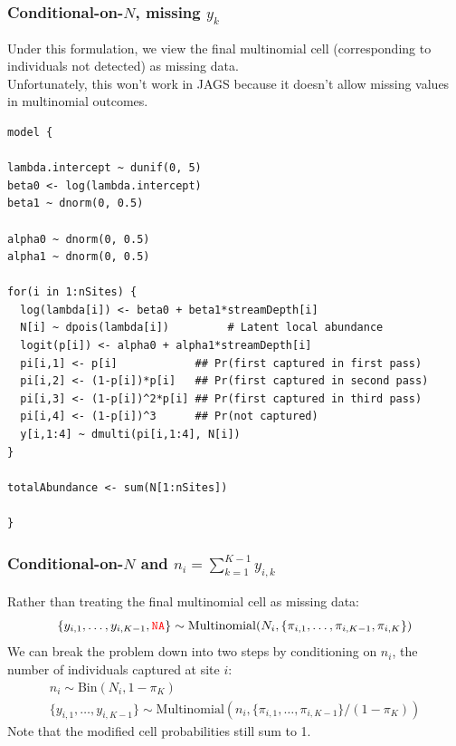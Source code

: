 \documentclass[color=usenames,dvipsnames]{beamer}\usepackage[]{graphicx}\usepackage[]{color}
\makeatletter
\newenvironment{kframe}{%
 \def\at@end@of@kframe{}%
 \ifinner\ifhmode%
  \def\at@end@of@kframe{\end{minipage}}%
  \begin{minipage}{\columnwidth}%
 \fi\fi%
 \def\FrameCommand##1{\hskip\@totalleftmargin \hskip-\fboxsep
 \colorbox{shadecolor}{##1}\hskip-\fboxsep
     \hskip-\linewidth \hskip-\@totalleftmargin \hskip\columnwidth}%
 \MakeFramed {\advance\hsize-\width
   \@totalleftmargin\z@ \linewidth\hsize
   \@setminipage}}%
 {\par\unskip\endMakeFramed%
 \at@end@of@kframe}
\newenvironment{knitrout}{}{} %
\makeatother
\begin{document}
\begin{frame}[fragile]
  \frametitle{Conditional-on-$N$, missing $y_k$}
  \footnotesize
  Under this formulation, we view the final multinomial cell
  (corresponding to individuals not detected) as missing data. \\
  \pause
  \vfill
  Unfortunately, this won't work in JAGS because it doesn't allow
  missing values in multinomial outcomes.
  \pause
\begin{knitrout}\tiny
{}\color{fgcolor}\begin{kframe}
\begin{verbatim}
model {

lambda.intercept ~ dunif(0, 5)
beta0 <- log(lambda.intercept)
beta1 ~ dnorm(0, 0.5)

alpha0 ~ dnorm(0, 0.5)  
alpha1 ~ dnorm(0, 0.5)

for(i in 1:nSites) {
  log(lambda[i]) <- beta0 + beta1*streamDepth[i]
  N[i] ~ dpois(lambda[i])         # Latent local abundance
  logit(p[i]) <- alpha0 + alpha1*streamDepth[i]
  pi[i,1] <- p[i]            ## Pr(first captured in first pass)
  pi[i,2] <- (1-p[i])*p[i]   ## Pr(first captured in second pass)
  pi[i,3] <- (1-p[i])^2*p[i] ## Pr(first captured in third pass)
  pi[i,4] <- (1-p[i])^3      ## Pr(not captured)
  y[i,1:4] ~ dmulti(pi[i,1:4], N[i])
}

totalAbundance <- sum(N[1:nSites])

}
\end{verbatim}
\end{kframe}
\end{knitrout}

\end{frame}





\begin{frame}[fragile]
  \frametitle{\normalsize Conditional-on-$N$ and $n_i=\sum_{k=1}^{K-1} y_{i,k}$}
  Rather than treating the final multinomial cell as missing data:
  \[
    \{y_{i,1}, \dots, y_{i,K-1}, \mathtt{\color{red} NA}\} \sim
    \mathrm{Multinomial}(N_i, \{\pi_{i,1}, \dots, \pi_{i,K-1}, \pi_{i,K}\})
  \]
  \pause
  \vfill
  We can break the problem down into two steps by conditioning on
  $n_i$, the number of individuals captured at site $i$:
  \small
  \begin{gather*}
    n_i \sim \mathrm{Bin}(N_i, 1-\pi_K) \\
    \{y_{i,1}, \dots, y_{i,K-1}\} \sim \mathrm{Multinomial}(n_i,
    \{\pi_{i,1}, \dots, \pi_{i,K-1}\}/(1-\pi_K))
  \end{gather*}
  \pause
  \vfill
  Note that the modified cell probabilities still sum to 1. 
\end{frame}
\end{document}
